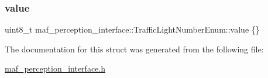 \subsubsection{\texorpdfstring{value}{value}}
{\footnotesize\ttfamily uint8\+\_\+t maf\+\_\+perception\+\_\+interface\+::\+Traffic\+Light\+Number\+Enum\+::value \{\}}



The documentation for this struct was generated from the following file\+:\begin{DoxyCompactItemize}
\item 
\hyperlink{maf__perception__interface_8h}{maf\+\_\+perception\+\_\+interface.\+h}\end{DoxyCompactItemize}
